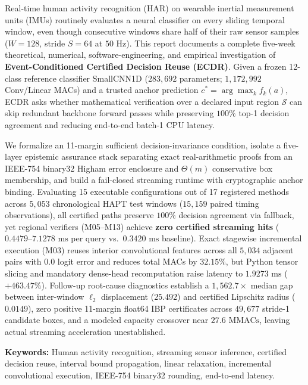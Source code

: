 \documentclass[11pt,oneside,a4paper]{report}
\newcommand{\code}[1]{{\small\upshape\ttfamily #1}}
\newcommand{\Sset}{\mathcal{S}}
\theoremstyle{remark}
\begin{document}
Real-time human activity recognition (HAR) on wearable inertial measurement units (IMUs) routinely evaluates a neural classifier on every sliding temporal window, even though consecutive windows share half of their raw sensor samples ($W=128$, stride $S=64$ at $50\text{ Hz}$). This report documents a complete five-week theoretical, numerical, software-engineering, and empirical investigation of \textbf{Event-Conditioned Certified Decision Reuse (ECDR)}. Given a frozen 12-class reference classifier \code{SmallCNN1D} ($283,692$ parameters; $1,172,992$ Conv/Linear MACs) and a trusted anchor prediction $c^* = \arg\max_k f_k(a)$, ECDR asks whether mathematical verification over a declared input region $\Sset$ can skip redundant backbone forward passes while preserving $100\%$ top-1 decision agreement and reducing end-to-end batch-1 CPU latency.

We formalize an 11-margin sufficient decision-invariance condition, isolate a five-layer epistemic assurance stack separating exact real-arithmetic proofs from an IEEE-754 \code{binary32} Higham error enclosure and $\Theta(m)$ conservative box membership, and build a fail-closed streaming runtime with cryptographic anchor binding. Evaluating 15 executable configurations out of 17 registered methods across $5,053$ chronological HAPT test windows ($15,159$ paired timing observations), all certified paths preserve $100\%$ decision agreement via fallback, yet regional verifiers (\code{M05}--\code{M13}) achieve \textbf{zero certified streaming hits} ($0.4479\text{--}7.1278\text{ ms}$ per query vs.\ $0.3420\text{ ms}$ baseline). Exact stagewise incremental execution (\code{M03}) reuses interior convolutional features across all $5,034$ adjacent pairs with $0.0$ logit error and reduces total MACs by $32.15\%$, but Python tensor slicing and mandatory dense-head recomputation raise latency to $1.9273\text{ ms}$ ($+463.47\%$). Follow-up root-cause diagnostics establish a $1,562.7\times$ median gap between inter-window $\ell_2$ displacement ($25.492$) and certified Lipschitz radius ($0.0149$), zero positive 11-margin \code{float64} IBP certificates across $49,677$ stride-1 candidate boxes, and a modeled capacity crossover near $27.6\text{ MMACs}$, leaving actual streaming acceleration unestablished.

\vspace{1em}
\textbf{Keywords:} Human activity recognition, streaming sensor inference, certified decision reuse, interval bound propagation, linear relaxation, incremental convolutional execution, IEEE-754 \code{binary32} rounding, end-to-end latency.
\end{document}
